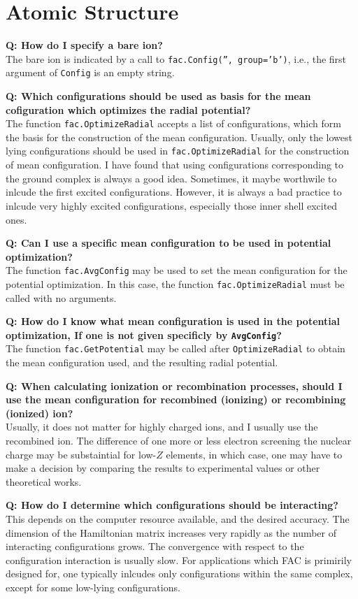\documentclass[twoside,letterpaper]{refrep}
\newcommand{\key}[1]{\texttt{#1}}
\newcounter{faq}[section]
\newcommand{\faq}[2]{\stepcounter{faq}
	\begin{minipage}{\textwidth}
	\textbf{Q\arabic{faq}: #1?}\\#2
	\end{minipage}}
\begin{document}
\section{Atomic Structure}
\faq{How do I specify a bare ion}{
The bare ion is indicated by a call to \key{fac.Config('', group='b')}, i.e.,
the first argument of \key{Config} is an empty string.}

\faq{Which configurations should be used as basis for the mean cofiguration
which optimizes the radial potential}{
The function \key{fac.OptimizeRadial} accepts a list of configurations, which
form the basis for the construction of the mean configuration. Usually, only
the lowest lying configurations should be used in \key{fac.OptimizeRadial} for
the construction of mean configuration. I have found that using configurations
corresponding to the ground complex is always a good idea. Sometimes, it maybe
worthwile to inlcude the first excited configurations. However, it is always a
bad practice to inlcude very highly excited configurations, especially those
inner shell excited ones.}

\faq{Can I use a specific mean configuration to be used in potential
optimization}{
The function \key{fac.AvgConfig} may be used to set the mean configuration for
the potential optimization. In this case, the function
\key{fac.OptimizeRadial} must be called with no arguments.}

\faq{How do I know what mean configuration is used in the potential
optimization, If one is not given specificly by \key{AvgConfig}}{
The function \key{fac.GetPotential} may be called after \key{OptimizeRadial}
to obtain the mean configuration used, and the resulting radial potential.}

\faq{When calculating ionization or recombination processes, should I use the
mean configuration for recombined (ionizing) or recombining (ionized) ion}{
Usually, it does not matter for highly charged ions, and I usually use the 
recombined ion. The difference of one more or less electron screening the
nuclear charge may be substaintial for low-$Z$ elements, in which case, one
may have to make a decision by comparing the results to experimental values or
other theoretical works.}

\faq{How do I determine which configurations should be interacting}{
This depends on the computer resource available, and the desired accuracy. The
dimension of the Hamiltonian matrix increases very rapidly as the number of
interacting configurations grows. The convergence with respect to the
configuration interaction is usually slow. For applications which FAC is
primirily designed for, one typically inlcudes only configurations within the
same complex, except for some low-lying configurations.}
\end{document}
